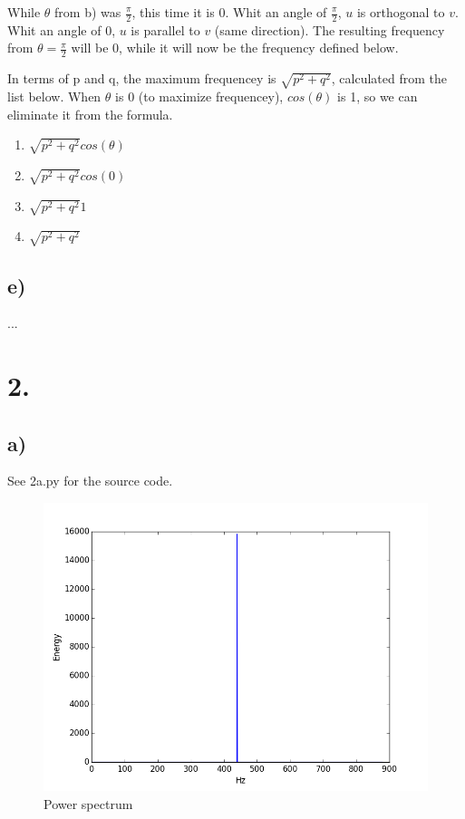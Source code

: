 While \(\theta\) from b) was \(\frac{\pi}{2}\), this time it is \(0\).
Whit an angle of \(\frac{\pi}{2}\), \(u\) is orthogonal to \(v\).
Whit an angle of \(0\), \(u\) is parallel to \(v\) (same direction).
The resulting frequency from \(\theta = \frac{\pi}{2}\) will be \(0\), while it will now be the frequency defined below.

In terms of p and q, the maximum frequencey is \(\sqrt{p^2 + q^2}\), calculated from the list below.
When \(\theta\) is \(0\) (to maximize frequencey), \(cos(\theta)\) is 1, so we can eliminate it from the formula.
\begin{enumerate}
  \item \(\sqrt{p^2 + q^2} cos(\theta)\)
  \item \(\sqrt{p^2 + q^2} cos(0)\)
  \item \(\sqrt{p^2 + q^2} 1\)
  \item \(\sqrt{p^2 + q^2}\)
\end{enumerate}

\subsection*{e)}
...

\section*{2.}
\subsection*{a)}
See 2a.py for the source code.

\begin{figure}[h]
\includegraphics[width=\textwidth]{2a_power_spectrum}
\caption{Power spectrum}
\label{fig:2a}
\end{figure}

